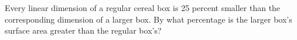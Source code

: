 Every linear dimension of a regular cereal box is 25 percent smaller than the corresponding dimension of a larger box. By what percentage is the larger box's surface area greater than the regular box's?
